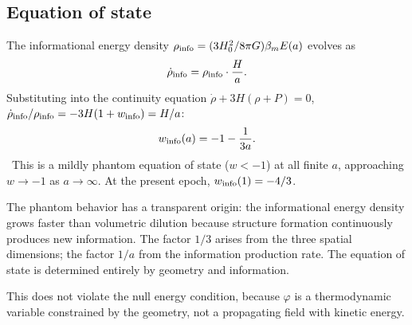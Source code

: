 \subsection{Equation of state}
The informational energy density $\rho_{\rm info}=(3H_0^2/8\pi G)\beta_mE(a)$ evolves as
\begin{equation}\dot\rho_{\rm info}=\rho_{\rm info}\cdot\frac Ha .\label{eq:th:rhodot2}\end{equation}
Substituting into the continuity equation $\dot\rho+3H(\rho+P)=0$, $\dot\rho_{\rm info}/\rho_{\rm info}=-3H(1+w_{\rm info})=H/a$:
\begin{equation}w_{\rm info}(a)=-1-\frac{1}{3a}.\label{eq:th:winfo}\end{equation}
\derived\ This is a mildly phantom equation of state ($w<-1$) at all finite $a$, approaching $w\to-1$ as $a\to\infty$. At the present epoch,
$w_{\rm info}(1)=-4/3$.

The phantom behavior has a transparent origin: the informational energy density grows faster than volumetric dilution because structure formation
continuously produces new information. The factor $1/3$ arises from the three spatial dimensions; the factor $1/a$ from the information production
rate. The equation of state is determined entirely by geometry and information. \interp

This does not violate the null energy condition, because $\varphi$ is a thermodynamic variable constrained by the geometry, not a propagating field
with kinetic energy.

